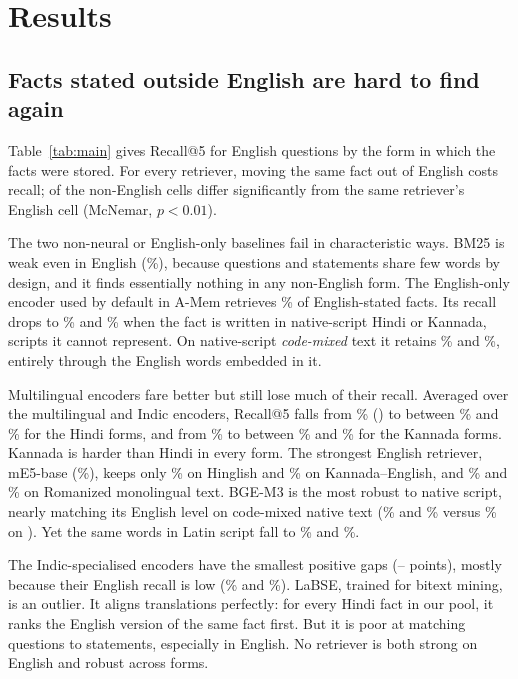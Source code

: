\section{Results}
\label{sec:results}

\subsection{Facts stated outside English are hard to find again}
\label{sec:main}
Table~\ref{tab:main} gives Recall@5 for English questions by the form in which the facts were stored. For every retriever, moving the same fact out of English costs recall; \NumSigCells{} of the \NumCells{} non-English cells differ significantly from the same retriever's English cell (McNemar, $p<0.01$).

The two non-neural or English-only baselines fail in characteristic ways. BM25 is weak even in English (\RBMHiEn\%), because questions and statements share few words by design, and it finds essentially nothing in any non-English form. The English-only encoder used by default in A-Mem retrieves \RMiniEnHiEn\% of English-stated facts. Its recall drops to \RMiniEnHiMoN\% and \RMiniEnKnMoN\% when the fact is written in native-script Hindi or Kannada, scripts it cannot represent. On native-script \emph{code-mixed} text it retains \RMiniEnHiCmN\% and \RMiniEnKnCmN\%, entirely through the English words embedded in it.

Multilingual encoders fare better but still lose much of their recall. Averaged over the \NumMulti{} multilingual and Indic encoders, Recall@5 falls from \RavgHiEn\% () to between \RavgHiMoR\% and \RavgHiCmN\% for the Hindi forms, and from \RavgKnEn\% to between \RavgKnMoR\% and \RavgKnCmN\% for the Kannada forms. Kannada is harder than Hindi in every form. The strongest English retriever, mE5-base (\RmEbaseHiEn\%), keeps only \RmEbaseHiCmR\% on Hinglish and \RmEbaseKnCmR\% on Kannada--English, and \RmEbaseHiMoR\% and \RmEbaseKnMoR\% on Romanized monolingual text. BGE-M3 is the most robust to native script, nearly matching its English level on code-mixed native text (\RBGEHiCmN\% and \RBGEKnCmN\% versus \RBGEHiEn\% on ). Yet the same words in Latin script fall to \RBGEHiCmR\% and \RBGEKnCmR\%.

The Indic-specialised encoders have the smallest positive gaps (\IndicGapMin--\IndicGapMax{} points), mostly because their English recall is low (\RIndSBHiEn\% and \RVyakHiEn\%). LaBSE, trained for bitext mining, is an outlier. It aligns translations perfectly: for every Hindi fact in our pool, it ranks the English version of the same fact first. But it is poor at matching questions to statements, especially in English. No retriever is both strong on English and robust across forms.


